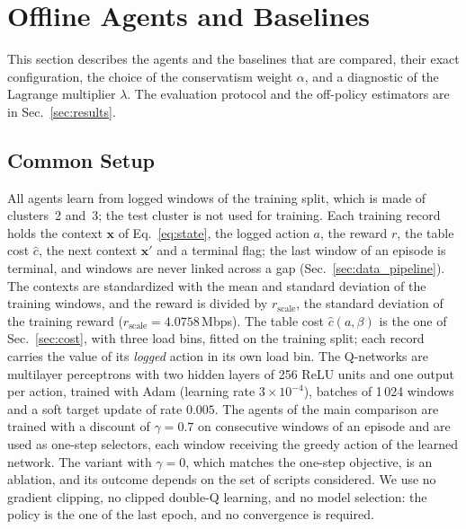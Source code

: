 \section{Offline Agents and Baselines}
\label{sec:methods}
\label{sec:method}

This section describes the agents and the baselines that are compared, their exact configuration, the choice of the conservatism weight $\alpha$, and a diagnostic of the Lagrange multiplier $\lambda$.%
The evaluation protocol and the off-policy estimators are in Sec.~\ref{sec:results}.%

\subsection{Common Setup}
\label{sec:common_setup}

All agents learn from logged windows of the training split, which is made of clusters~2 and~3; the test cluster is not used for training.%
Each training record holds the context $\mathbf{x}$ of Eq.~\eqref{eq:state}, the logged action $a$, the reward $r$, the table cost $\hat c$, the next context $\mathbf{x}'$ and a terminal flag; the last window of an episode is terminal, and windows are never linked across a gap (Sec.~\ref{sec:data_pipeline}).%
The contexts are standardized with the mean and standard deviation of the training windows, and the reward is divided by $r_{\mathrm{scale}}$, the standard deviation of the training reward ($r_{\mathrm{scale}}=4.0758$\,Mbps).%
The table cost $\hat c(a,\beta)$ is the one of Sec.~\ref{sec:cost}, with three load bins, fitted on the training split; each record carries the value of its \emph{logged} action in its own load bin.%
The Q-networks are multilayer perceptrons with two hidden layers of 256 ReLU units and one output per action, trained with Adam (learning rate $3\times10^{-4}$), batches of 1\,024 windows and a soft target update of rate $0.005$.%
The agents of the main comparison are trained with a discount of $\gamma=0.7$ on consecutive windows of an episode and are used as one-step selectors, each window receiving the greedy action of the learned network.%
The variant with $\gamma=0$, which matches the one-step objective, is an ablation, and its outcome depends on the set of scripts considered.%
We use no gradient clipping, no clipped double-Q learning, and no model selection: the policy is the one of the last epoch, and no convergence is required.%

